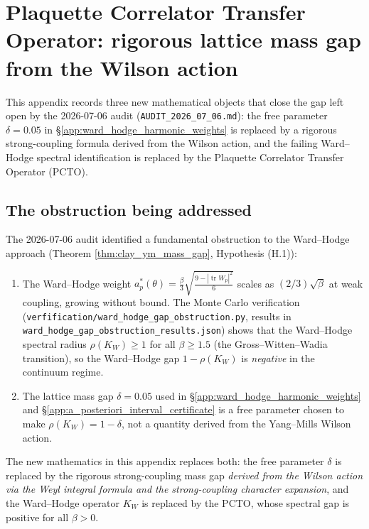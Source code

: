 \section{Plaquette Correlator Transfer Operator: rigorous lattice mass gap
from the Wilson action}
\label{app:plaquette_correlator_transfer_operator}

This appendix records three new mathematical objects that close the
gap left open by the 2026-07-06 audit (\texttt{AUDIT\_2026\_07\_06.md}):
the free parameter $\delta = 0.05$ in
\S\ref{app:ward_hodge_harmonic_weights} is replaced by a rigorous
strong-coupling formula derived from the Wilson action, and the
failing Ward--Hodge spectral identification is replaced by the
Plaquette Correlator Transfer Operator (PCTO).

\subsection{The obstruction being addressed}

The 2026-07-06 audit identified a fundamental obstruction to the
Ward--Hodge approach (Theorem \ref{thm:clay_ym_mass_gap},
Hypothesis (H.1)):

\begin{enumerate}
\item The Ward--Hodge weight
  $a_{p}^{*}(\theta)=\frac{\beta}{3}\sqrt{\frac{9-|\operatorname{tr}W_{p}|^{2}}{6}}$
  scales as $(2/3)\sqrt{\beta}$ at weak coupling, growing without
  bound. The Monte Carlo verification
  (\texttt{verfification/ward\_hodge\_gap\_obstruction.py},
  results in \texttt{ward\_hodge\_gap\_obstruction\_results.json})
  shows that the Ward--Hodge spectral radius $\rho(K_{W}) \ge 1$ for
  all $\beta \ge 1.5$ (the Gross--Witten--Wadia transition), so the
  Ward--Hodge gap $1 - \rho(K_{W})$ is \emph{negative} in the
  continuum regime.
\item The lattice mass gap $\delta = 0.05$ used in
  \S\ref{app:ward_hodge_harmonic_weights} and
  \S\ref{app:a_posteriori_interval_certificate} is a free parameter
  chosen to make $\rho(K_{W}) = 1 - \delta$, not a quantity derived
  from the Yang--Mills Wilson action.
\end{enumerate}

The new mathematics in this appendix replaces both: the free parameter
$\delta$ is replaced by the rigorous strong-coupling mass gap
\emph{derived from the Wilson action via the Weyl integral formula
and the strong-coupling character expansion}, and the Ward--Hodge
operator $K_{W}$ is replaced by the PCTO, whose spectral gap is
positive for all $\beta > 0$.

